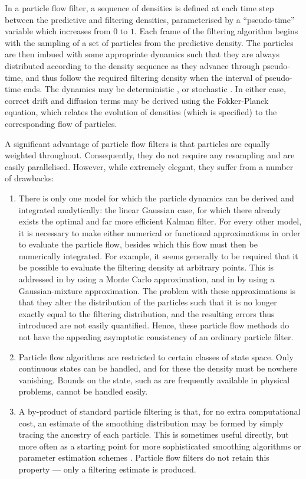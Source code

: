 \documentclass{statsoc}
\begin{document}
In a particle flow filter, a sequence of densities is defined at each time step between the predictive and filtering densities, parameterised by a ``pseudo-time'' variable which increases from $0$ to $1$. Each frame of the filtering algorithm begins with the sampling of a set of particles from the predictive density. The particles are then imbued with some appropriate dynamics such that they are always distributed according to the density sequence as they advance through pseudo-time, and thus follow the required filtering density when the interval of pseudo-time ends. The dynamics may be deterministic \citep{Daum2008}, or stochastic \citep{Daum2013,Reich2011}. In either case, correct drift and diffusion terms may be derived using the Fokker-Planck equation, which relates the evolution of densities (which is specified) to the corresponding flow of particles.

A significant advantage of particle flow filters is that particles are equally weighted throughout. Consequently, they do not require any resampling and are easily parallelised. However, while extremely elegant, they suffer from a number of drawbacks:
\begin{enumerate}
  \item There is only one model for which the particle dynamics can be derived and integrated analytically: the linear Gaussian case, for which there already exists the optimal and far more efficient Kalman filter. For every other model, it is necessary to make either numerical or functional approximations in order to evaluate the particle flow, besides which this flow must then be numerically integrated. For example, it seems generally to be required that it be possible to evaluate the filtering density at arbitrary points. This is addressed in \citep{Daum2012} by using a Monte Carlo approximation, and in \citep{Reich2012a} by using a Gaussian-mixture approximation. The problem with these approximations is that they alter the distribution of the particles such that it is no longer exactly equal to the filtering distribution, and the resulting errors thus introduced are not easily quantified. Hence, these particle flow methods do not have the appealing asymptotic consistency of an ordinary particle filter.
  \item Particle flow algorithms are restricted to certain classes of state space. Only continuous states can be handled, and for these the density must be nowhere vanishing. Bounds on the state, such as are frequently available in physical problems, cannot be handled easily.
  \item A by-product of standard particle filtering is that, for no extra computational cost, an estimate of the smoothing distribution may be formed by simply tracing the ancestry of each particle. This is sometimes useful directly, but more often as a starting point for more sophisticated smoothing algorithms \citep{Godsill2004,Bunch2012} or parameter estimation schemes \citep{Andrieu2010}. Particle flow filters do not retain this property --- only a filtering estimate is produced.
\end{enumerate}
\end{document}

